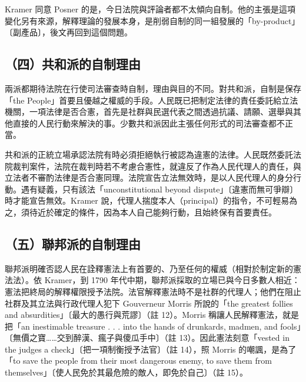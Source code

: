 Kramer 同意 Posner 的是，今日法院與評論者都不太傾向自制。他的主張是這項變化另有來源，解釋理論的發展本身，是削弱自制的同一組發展的「by-product」〔副產品〕，後文再回到這個問題。

\subsection{（四）共和派的自制理由}

兩派都期待法院在行使司法審查時自制，理由與目的不同。對共和派，自制是保存「the People」首要且優越之權威的手段。人民既已把制定法律的責任委託給立法機關，一項法律是否合憲，首先是社群與民選代表之間透過抗議、請願、選舉與其他直接的人民行動來解決的事。少數共和派因此主張任何形式的司法審查都不正當。

共和派的正統立場承認法院有時必須拒絕執行被認為違憲的法律。人民既然委託法院裁判案件，法院在裁判時若不考慮合憲性，就違反了作為人民代理人的責任，與立法者不審酌法律是否合憲同理。法院宣告立法無效時，是以人民代理人的身分行動。遇有疑義，只有該法「unconstitutional beyond dispute」〔違憲而無可爭辯〕時才能宣告無效。Kramer 說，代理人揣度本人（principal）的指令，不可輕易為之，須待近於確定的條件，因為本人自己能夠行動，且始終保有首要責任。

\subsection{（五）聯邦派的自制理由}

聯邦派明確否認人民在詮釋憲法上有首要的、乃至任何的權威（相對於制定新的憲法法）。依 Kramer，到 1790 年代中期，聯邦派採取的立場已與今日多數人相近：憲法把終局的解釋權限授予法院。法官解釋憲法時不是社群的代理人；他們在阻止社群及其立法與行政代理人犯下 Gouverneur Morris 所說的「the greatest follies and absurdities」〔最大的愚行與荒謬〕（註 12）。Morris 稱讓人民解釋憲法，就是把「an inestimable treasure . . . into the hands of drunkards, madmen, and fools」〔無價之寶\ldots\ldots 交到醉漢、瘋子與傻瓜手中〕（註 13）。因此憲法刻意「vested in the judges a check」〔把一項制衡授予法官〕（註 14），照 Morris 的嘲諷，是為了「to save the people from their most dangerous enemy, to save them from themselves」〔使人民免於其最危險的敵人，即免於自己〕（註 15）。

